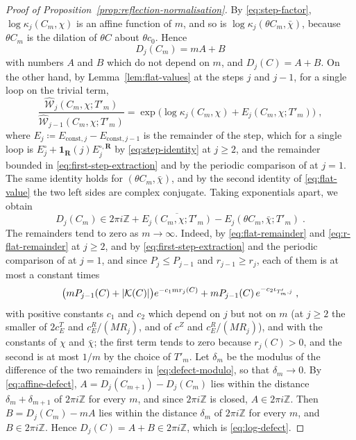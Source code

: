 \documentclass[11pt]{preprint}
\DeclarePairedDelimiter{\abs}{\lvert}{\rvert}
\numberwithin{equation}{section}
\theoremstyle{definition}
\theoremstyle{remark}
\theoremstyle{plain}
\begin{document}
\begin{proof}[Proof of Proposition~\ref{prop:reflection-normalisation}]
By \eqref{eq:step-factor}, $\log\kappa_j(C_m, \chi)$ is an affine function of $m$, and so is $\log\kappa_j(\theta C_m, \bar\chi)$, because $\theta C_m$ is the dilation of $\theta C$ about $\theta c_0$. Hence
\begin{equation}\label{eq:affine-defect}
    D_j(C_m) = mA + B
\end{equation}
with numbers $A$ and $B$ which do not depend on $m$, and $D_j(C) = A + B$. On the other hand, by Lemma~\ref{lem:flat-values} at the steps $j$ and $j - 1$, for a single loop on the trivial term,
\begin{equation}\label{eq:flat-step-ratio}
    \frac{\widehat{\mathcal W}_j(C_m, \chi; T'_m)}{\widehat{\mathcal W}_{j-1}(C_m, \chi; T'_m)} = \exp\bigl(\log\kappa_j(C_m, \chi) + E_j(C_m, \chi; T'_m)\bigr)\;,
\end{equation}
where $E_j \coloneqq E_{\mathrm{const},j} - E_{\mathrm{const},j-1}$ is the remainder of the step, which for a single loop is $E^\circ_j + \mathbf 1_{\mathbf R}(j)E^{\circ,\mathbf R}_j$ by \eqref{eq:step-identity} at $j \geq 2$, and the remainder bounded in \eqref{eq:first-step-extraction} and by the periodic comparison of \cite[Appendix~F]{WilsonFirstStep} at $j = 1$. The same identity holds for $(\theta C_m, \bar\chi)$, and by the second identity of \eqref{eq:flat-value} the two left sides are complex conjugate. Taking exponentials apart, we obtain
\begin{equation}\label{eq:defect-modulo}
    D_j(C_m) \in 2\pi i\mathbb Z + \overline{E_j(C_m, \chi; T'_m)} - E_j(\theta C_m, \bar\chi; T'_m)\;.
\end{equation}
The remainders tend to zero as $m \to \infty$. Indeed, by \eqref{eq:flat-remainder} and \eqref{eq:r-flat-remainder} at $j \geq 2$, and by \eqref{eq:first-step-extraction} and the periodic comparison of \cite[Appendix~F]{WilsonFirstStep} at $j = 1$, and since $P_j \leq P_{j-1}$ and $r_{j-1} \geq r_j$, each of them is at most a constant times
\begin{equation}\label{eq:dilation-remainder}
    \bigl(mP_{j-1}(C) + \abs{\mathcal K(C)}\bigr)e^{-c_1mr_j(C)} + mP_{j-1}(C)\,e^{-c_2\iota_{T'_m,j}}\;,
\end{equation}
with positive constants $c_1$ and $c_2$ which depend on $j$ but not on $m$ (at $j \geq 2$ the smaller of $2c^T_E$ and $c^R_E/(MR_j)$, and of $c^Z$ and $c^R_E/(MR_j)$), and with the constants of $\chi$ and $\bar\chi$; the first term tends to zero because $r_j(C) > 0$, and the second is at most $1/m$ by the choice of $T'_m$. Let $\delta_m$ be the modulus of the difference of the two remainders in \eqref{eq:defect-modulo}, so that $\delta_m \to 0$. By \eqref{eq:affine-defect}, $A = D_j(C_{m+1}) - D_j(C_m)$ lies within the distance $\delta_m + \delta_{m+1}$ of $2\pi i\mathbb Z$ for every $m$, and since $2\pi i\mathbb Z$ is closed, $A \in 2\pi i\mathbb Z$. Then $B = D_j(C_m) - mA$ lies within the distance $\delta_m$ of $2\pi i\mathbb Z$ for every $m$, and $B \in 2\pi i\mathbb Z$. Hence $D_j(C) = A + B \in 2\pi i\mathbb Z$, which is \eqref{eq:log-defect}.
\end{proof}
\end{document}
